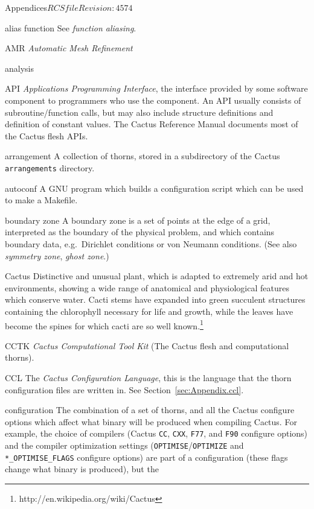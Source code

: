 \begin{cactuspart}{Appendices}{$RCSfile$}{$Revision: 4574 $}
\begin{Lentry}
\item[alias function]
  See \textit{function aliasing}.
\item[AMR]
  \textit{Automatic Mesh Refinement}
\item[analysis]
\item[API]
  \textit{Applications Programming Interface}, the interface provided by
  some software component to programmers who use the component. 
  An API usually consists of subroutine/function calls, but may also include
  structure definitions and definition of constant values.
  The Cactus Reference Manual documents most of the Cactus flesh APIs.
\item[arrangement]
  A collection of thorns, stored in a subdirectory of the Cactus
  \verb|arrangements| directory.%
\item[autoconf]
  A GNU program which builds a configuration script which can be used
  to make a Makefile.
\item[boundary zone]
  A boundary zone is a set of points at the edge of a grid, interpreted as
  the boundary of the physical problem, and which contains boundary data,
  e.g.\ Dirichlet conditions or von Neumann conditions.
  (See also \textit{symmetry zone}, \textit{ghost zone}.)
\item[Cactus]
Distinctive and unusual plant, which is adapted to extremely arid and hot environments, showing a wide range of anatomical and physiological features which conserve water. Cacti stems have expanded into green succulent structures containing the chlorophyll necessary for life and growth, while the leaves have become the spines for which cacti are so well known.\footnote{%
http://en.wikipedia.org/wiki/Cactus
       }%
\item[CCTK]
  \textit{Cactus Computational Tool Kit} (The Cactus flesh and computational
  thorns).
\item[CCL]
  The \textit{Cactus Configuration Language}, this is the language that
  the thorn configuration files are written in.
  See Section~\ref{sec:Appendix.ccl}.
\item[configuration]
  The combination of a set of thorns, and all the Cactus configure
  options which affect what binary will be produced when compiling
  Cactus.  For example, the choice of compilers (Cactus \verb|CC|,
  \verb|CXX|, \verb|F77|, and \verb|F90| configure options) and the
  compiler optimization settings (\verb|OPTIMISE|/\verb|OPTIMIZE| and
  \verb|*_OPTIMISE_FLAGS| configure options) are part of a
  configuration (these flags change what binary is produced), but the

\end{Lentry}
\end{cactuspart}
